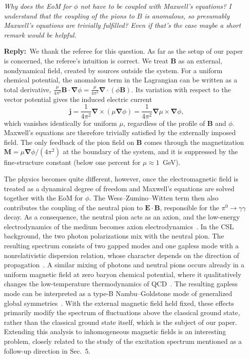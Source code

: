 \documentclass[11pt,a4paper]{article}
\newcommand{\vek}[1]{\bm{#1}}
\newcommand{\grad}{\vek\nabla}
\newenvironment{referee}{\par\medskip\noindent\color{black!70}\itshape}{\par\medskip}
\newcommand{\reply}{\noindent\textbf{Reply:}\ }
\begin{document}
\begin{referee}
Why does the EoM for $\phi$ not have to be coupled with Maxwell's equations? I understand that the coupling of the pions to $B$ is anomalous, so presumably Maxwell's equations are trivially fulfilled? Even if that's the case maybe a short remark would be helpful.
\end{referee}

\reply We thank the referee for this question. As far as the setup of our paper is concerned, the referee's intuition is correct. We treat $\vek B$ as an external, nondynamical field, created by sources outside the system. For a uniform chemical potential, the anomalous term in the Lagrangian can be written as a total derivative, $\frac{\mu}{4\pi^2}\vek B\cdot\grad\phi=\frac{\mu}{4\pi^2}\grad\cdot(\phi\vek B)$. Its variation with respect to the vector potential gives the induced electric current
\begin{equation*}
\vek j=\frac{1}{4\pi^2}\grad\times(\mu\grad\phi)=\frac{1}{4\pi^2}\grad\mu\times\grad\phi,
\end{equation*}
which vanishes identically for uniform $\mu$, regardless of the profile of $\vek B$ and $\phi$. Maxwell's equations are therefore trivially satisfied by the externally imposed field. The only feedback of the pion field on $\vek B$ comes through the magnetization $\vek M=\mu\grad\phi/(4\pi^2)$ at the boundary of the system, and it is suppressed by the fine-structure constant (below one percent for $\mu\approx1$~GeV).

The physics becomes quite different, however, once the electromagnetic field is treated as a dynamical degree of freedom and Maxwell's equations are solved together with the EoM for $\phi$. The Wess--Zumino--Witten term then also contributes the coupling of the neutral pion to $\vek E\cdot\vek B$, responsible for the $\pi^0\to\gamma\gamma$ decay. As a consequence, the neutral pion acts as an axion, and the low-energy electrodynamics of the medium becomes axion electrodynamics~\cite{Yamamoto:2015maz}. In the CSL background, the two photon polarizations mix with the neutral pion. The resulting spectrum consists of two gapped modes and one gapless mode with a nonrelativistic dispersion relation, whose character depends on the direction of propagation~\cite{Brauner:2017mui}. A similar mixing of photons and neutral pions occurs already in a uniform magnetic field at zero baryon chemical potential, where it qualitatively changes the low-temperature thermodynamics of QCD~\cite{BraunerKadam2017thermo}. The resulting gapless mode can be interpreted as a type-B Nambu--Goldstone mode of generalized global symmetries~\cite{SogabeYamamoto2019}. With the external magnetic field held fixed, these effects primarily modify the spectrum of fluctuations above the classical ground state, rather than the classical ground state itself, which is the subject of our paper. Extending this analysis to inhomogeneous magnetic fields is an interesting problem, closely related to the study of the excitation spectrum mentioned as a follow-up direction in Sec.~5.
\end{document}

